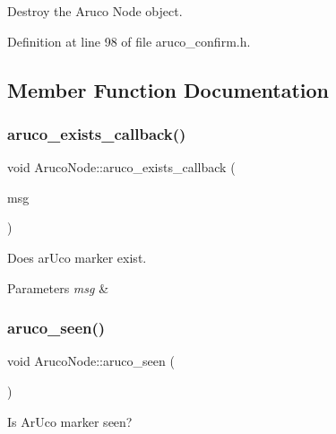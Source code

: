 Destroy the Aruco Node object. 



Definition at line 98 of file aruco\+\_\+confirm.\+h.



\subsection{Member Function Documentation}
\mbox{\label{class_aruco_node_a38f5977cae0f0cc0d30449db22b2e9d6}} 
\subsubsection{\texorpdfstring{aruco\+\_\+exists\+\_\+callback()}{aruco\_exists\_callback()}}
{\footnotesize\ttfamily void Aruco\+Node\+::aruco\+\_\+exists\+\_\+callback (\begin{DoxyParamCaption}\item[{const fiducial\+\_\+msgs\+::\+Fiducial\+Transform\+Array\+::\+Const\+Ptr \&}]{msg }\end{DoxyParamCaption})}



Does ar\+Uco marker exist. 


\begin{DoxyParams}{Parameters}
{\em msg} & \\
\hline
\end{DoxyParams}
\mbox{\label{class_aruco_node_a21fe5af1a16e884424a4065ca6dd608f}} 
\subsubsection{\texorpdfstring{aruco\+\_\+seen()}{aruco\_seen()}}
{\footnotesize\ttfamily void Aruco\+Node\+::aruco\+\_\+seen (\begin{DoxyParamCaption}{ }\end{DoxyParamCaption})}



Is Ar\+Uco marker seen? 

\mbox{\label{class_aruco_node_af68c583d73a36c483d28b96a6fd22713}} 
